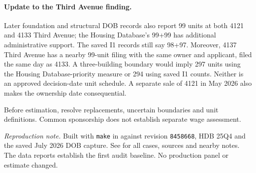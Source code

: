 \paragraph{Update to the Third Avenue finding.} Later foundation and structural DOB records also report 99 units at both 4121 and 4133 Third Avenue; the Housing Database's 99+99 has additional administrative support. The saved I1 records still say 98+97. Moreover, 4137 Third Avenue has a nearby 99-unit filing with the same owner and applicant, filed the same day as 4133. A three-building boundary would imply 297 units using the Housing Database-priority measure or 294 using saved I1 counts. Neither is an approved decision-date unit schedule. A separate sale of 4121 in May 2026 also makes the ownership date consequential.

Before estimation, resolve replacements, uncertain boundaries and unit definitions. Common sponsorship does not establish separate wage assessment.

\textit{Reproduction note.} Built with \texttt{make} in
 against revision
\texttt{8458668}, HDB 25Q4 and the saved July 2026 DOB capture. See  for all cases, sources and nearby notes.
The data reports establish the first audit baseline. No production panel or estimate changed.
